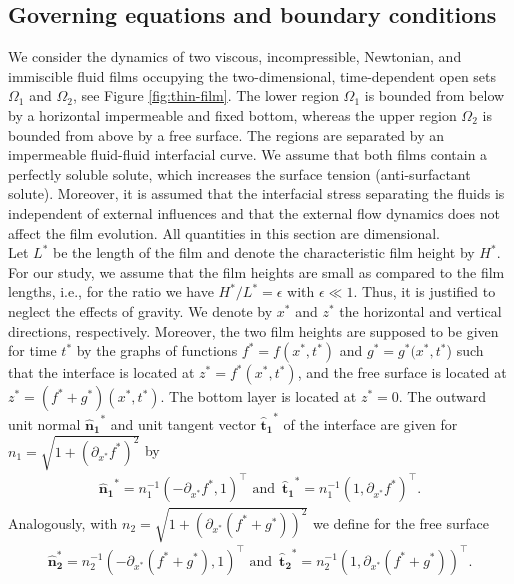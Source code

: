 \documentclass[11pt]{article}
\numberwithin{equation}{section}
\newtheorem{counter example}[theorem]{Counter Example}
\begin{document}
{\subsection{Governing equations and boundary conditions}\label{subsec: 2.1}
We consider the dynamics of two viscous, incompressible, Newtonian, and immiscible fluid films occupying the two-dimensional,
 time-dependent open sets
 $\Omega_1$ and  $\Omega_2$, see Figure \ref{fig:thin-film}.    The lower region $\Omega_1$ is bounded from below
by a horizontal impermeable and fixed bottom, whereas the upper region $\Omega_2$ is bounded from above by a free surface. The regions are separated by an impermeable fluid-fluid interfacial curve. We assume that both films contain a perfectly soluble solute, which increases the surface tension (anti-surfactant solute). Moreover, it is assumed that the interfacial stress separating the fluids is independent of external influences and that the external flow dynamics does not affect the film evolution. All quantities in this section are dimensional. \\ %
 Let $L^*$ be the length of the film and denote the characteristic film height by $H^*$.  For our study, we assume that the film heights are small as compared to the film lengths, i.e., for the ratio we have $H^*/L^*=\epsilon$ with $\epsilon\ll 1$. Thus, it is justified to neglect the effects of gravity.
 We denote by $x^*$ and $z^*$ the horizontal and vertical directions, respectively. Moreover, the two film heights are supposed to be given for time $t^*$ by the graphs of functions $f^*=f( x^*, t^*)$ and $g^*=g^* (x^*, t^*$) such that the interface is located at $z^*=f^*( x^*, t^*)$, and the free surface is located at $z^*=(f^*+g^*)( x^*, t^*)$. The bottom layer is located at $z^*=0$. 
The outward unit normal $ {\mathbf{\hat{n}_1}}^* $ and unit  tangent vector $ \mathbf{\hat{t}_1}^*$  of the interface are given for $ n_1 = \sqrt{1+(\partial_{x^*} f^*)^2}$ by 
\begin{align*}
{\mathbf{\hat{n}_1}}^*= n^{-1}_1 \left(-\partial_{x^*} f^*, 1\right)^\top
\text{ and }\, 
\mathbf{\hat{t}_1}^*=   n^{-1}_1   \left(1,\partial_{x^*} f^*\right)^\top.
\end{align*}
Analogously, with $n_2=\sqrt{1+\left(\partial_{x^*} (f^*+g^*)\right)^{2}}$ we define for the  free surface 
\begin{align*}
\mathbf{\hat{n}_2^*}=n_2^{-1}\left(-\partial_{x^*} (f^*+g^*),  1\right)^\top
\text{ and }\,
\mathbf{\hat{t}_2}^*=n_2^{-1}\left(1,\partial_{x^*} (f^*+g^*)\right)^\top.

\end{align*}}
\end{document}
